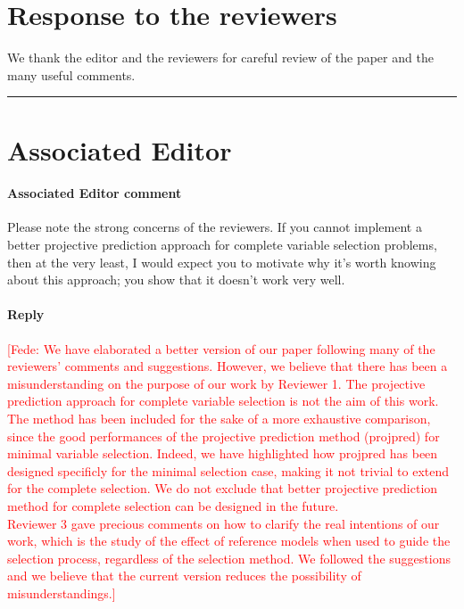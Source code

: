 \documentclass[11pt]{article}
\newcounter{reviewer}
\newcommand{\todo}{\subsection*{\textcolor{red}{To do (comment out when done)}:}}
\newcommand{\fede}[1]{\textcolor{red}{[Fede: #1]}}
\begin{document}
\section*{Response to the reviewers}
We thank the editor and the reviewers for careful review of the paper and the many useful comments.
\bigskip 
\hrule
\medskip 
\section*{Associated Editor}

\paragraph{Associated Editor comment}
Please note the strong concerns of the reviewers. If you cannot implement a better projective prediction approach for complete variable selection problems, then at the very least, I would expect you to motivate why it's worth knowing about this approach; you show that it doesn't work very well.

\paragraph{Reply}
\fede{We have elaborated a better version of our paper following many of the reviewers' comments and suggestions. However, we believe that there has been a misunderstanding on the purpose of our work by Reviewer 1. The projective prediction approach for complete variable selection is not the aim of this work. The method has been included for the sake of a more exhaustive comparison, since the good performances of the projective prediction method (projpred) for minimal variable selection. Indeed, we have highlighted how projpred has been designed specificly for the minimal selection case, making it not trivial to extend for the complete selection. We do not exclude that better projective prediction method for complete selection can be designed in the future. \\
Reviewer 3 gave precious comments on how to clarify the real intentions of our work, which is the study of the effect of reference models when used to guide the selection process, regardless of the selection method. We followed the suggestions and we believe that the current version reduces the possibility of misunderstandings.}

\end{document}
